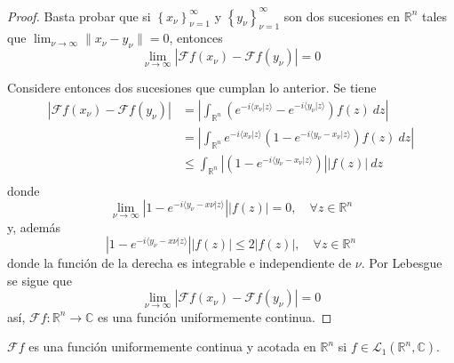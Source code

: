 \documentclass[12pt]{report}
\newcounter{it}
\theoremstyle{largebreak}
\renewcommand{\leq}{\ensuremath{\leqslant}}
\newcommand\abs[1]{\ensuremath{\left|#1\right|}}
\newcommand\cf[3]{\ensuremath{#1:#2\rightarrow#3}}
\newcommand\norm[1]{\ensuremath{\|#1\|}}
\newcommand\pint[2]{\ensuremath{\langle#1| #2\rangle}}
\newcommand{\fou}[1]{\ensuremath{\mathcal{F}#1}}
\begin{document}
    \begin{proof}
        Basta probar que si $\left\{x_\nu\right\}_{ \nu=1}^\infty$ y $\left\{y_\nu \right\}_{ \nu=1}^\infty$ son dos sucesiones en $\mathbb{R}^n$ tales que $\lim_{ \nu\rightarrow\infty}\norm{x_\nu-y_\nu}=0$, entonces
        \begin{equation*}
            \lim_{\nu\rightarrow\infty}\abs{\fou{f}(x_\nu)-\fou{f}(y_\nu)}=0
        \end{equation*}

        Considere entonces dos sucesiones que cumplan lo anterior. Se tiene
        \begin{equation*}
            \begin{split}
                \abs{\fou{f}(x_\nu)-\fou{f}(y_\nu)}&=\abs{\int_{\mathbb{R}^n}\left(e^{ -i\pint{x_\nu}{z}}-e^{ -i\pint{y_\nu}{z}} \right)f(z)\:dz}\\
                &=\abs{\int_{\mathbb{R}^n}e^{ -i\pint{x_\nu}{z}}\left(1-e^{ -i\pint{y_\nu-x_\nu}{z}} \right)f(z)\:dz}\\
                &\leq\int_{\mathbb{R}^n}\abs{\left(1-e^{ -i\pint{y_\nu-x_\nu}{z}} \right)}\abs{f(z)}\:dz\\
            \end{split}
        \end{equation*}
        donde
        \begin{equation*}
            \lim_{\nu\rightarrow\infty}\abs{1-e^{-i\pint{y_\nu-x\nu}{z}}}\abs{f(z)}=0,\quad\forall z\in\mathbb{R}^n
        \end{equation*}
        y, además
        \begin{equation*}
            \abs{1-e^{-i\pint{y_\nu-x\nu}{z}}}\abs{f(z)}\leq2\abs{f(z)},\quad\forall z\in\mathbb{R}^n
        \end{equation*}
        donde la función de la derecha es integrable e independiente de $\nu$. Por Lebesgue se sigue que
        \begin{equation*}
            \lim_{\nu\rightarrow\infty}\abs{\fou{f}(x_\nu)-\fou{f}(y_\nu)}=0
        \end{equation*}
        así, $\cf{\fou{f}}{\mathbb{R}^n}{\mathbb{C}}$ es una función uniformemente continua.
    \end{proof}

    \begin{obs}
        $\fou{f}$ es una función uniformemente continua y acotada en $\mathbb{R}^n$ si $f\in\mathcal{L}_1(\mathbb{R}^n,\mathbb{C})$.
    \end{obs}
\end{document}
